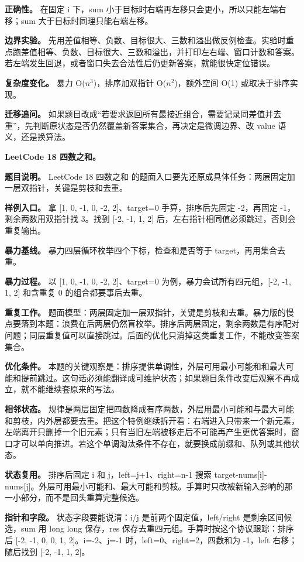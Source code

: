 \textbf{正确性。} 在固定 i 下，sum 小于目标时右端再左移只会更小，所以只能左端右移；sum 大于目标时同理只能右端左移。

\textbf{边界实验。} 先用差值相等、负数、目标很大、三数和溢出做反例检查。实验时重点跑差值相等、负数、目标很大、三数和溢出，并打印左右端、窗口计数和答案。若左端发生回退，或者窗口失去合法性后仍更新答案，就能很快定位错误。

\textbf{复杂度变化。} 暴力 O(\ensuremath{n^{3}})，排序加双指针 O(\ensuremath{n^{2}})，额外空间 O(1) 或取决于排序实现。

\textbf{迁移追问。} 如果题目改成“若要求返回所有最接近组合，需要记录同差值并去重”，先判断原状态是否仍然覆盖新答案集合，再决定是微调边界、改 value 语义，还是换算法。

\noindent\textbf{LeetCode 18 四数之和。}

\textbf{题目说明。} LeetCode 18 四数之和 的题面入口要先还原成具体任务：两层固定加一层双指针，关键是剪枝和去重。

\textbf{样例入口。} 拿 [1, 0, -1, 0, -2, 2]、target=0 手算，排序后先固定 -2，再固定 -1，剩余两数用双指针找 3。找到 [-2, -1, 1, 2] 后，左右指针相同值必须跳过，否则会重复输出。

\textbf{暴力基线。} 暴力四层循环枚举四个下标，检查和是否等于 target，再用集合去重。

\textbf{暴力过程。} 以 [1, 0, -1, 0, -2, 2]、target=0 为例，暴力会试所有四元组，[-2, -1, 1, 2] 和含重复 0 的组合都要事后去重。

\textbf{重复工作。} 题面模型：两层固定加一层双指针，关键是剪枝和去重。暴力版的慢点要落到本题：浪费在后两层仍然盲枚举。排序后两层固定，剩余两数是有序配对问题；同层重复值可以直接跳过。后面的优化只消掉这类重复工作，不能改变答案集合。

\textbf{优化条件。} 本题的关键观察是：排序提供单调性，外层可用最小可能和和最大可能和提前跳过。这句话必须能翻译成可维护状态；如果题目条件改变后观察不再成立，就不能继续套原来的写法。

\textbf{相邻状态。} 规律是两层固定把四数降成有序两数，外层用最小可能和与最大可能和剪枝，内外层都要去重。把这个特例继续拆开看：右端进入只带来一个新元素，左端离开只删掉一个旧元素；只有当旧左端被移走后不可能再产生更优答案时，窗口才可以单向推进。若这个单调淘汰条件不存在，就要换成前缀和、队列或其他状态。

\textbf{状态复用。} 排序后固定 i 和 j，left=j+1、right=n-1 搜索 target-nums[i]-nums[j]。外层可用最小可能和、最大可能和剪枝。手算时只改被新输入影响的那一小部分，而不是回头重算完整候选。

\textbf{指针和字段。} 状态字段要能说清：i/j 是前两个固定值，left/right 是剩余区间候选，sum 用 long long 保存，res 保存去重四元组。手算时按这个协议跟踪：排序后 [-2, -1, 0, 0, 1, 2]。i=-2、j=-1 时，left=0、right=2，四数和为 -1，left 右移；随后找到 [-2, -1, 1, 2]。

